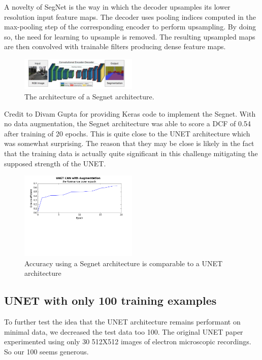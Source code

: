 \documentclass[letterpaper]{article}
\begin{document}
A novelty of SegNet  is the way in which the decoder upsamples its lower resolution input feature maps. The decoder uses pooling indices computed in the max-pooling step of the corresponding encoder to perform upsampling. By doing so, the need for learning to upsample is removed. The resulting upsampled maps are then convolved with trainable filters producing dense feature maps. 

 \begin{figure}[H]
  \centerline{\includegraphics[width=0.5\textwidth]{Images/SegNetArchitecture.png}}
  \caption{The architecture of a Segnet architecture.}
  \label{fig:segnet}
\end{figure}


Credit to Divam Gupta for providing Keras code to implement the Segnet. \cite{segnetimplementation}With no data augmentation, the Segnet architecture was able to score a DCF of 0.54 after training of 20 epochs. This is quite close to the UNET architecture which was somewhat surprising. The reason that they may be close is likely in the fact that the training data is actually quite significant in this challenge mitigating the supposed strength of the UNET.

 \begin{figure}[H]
  \centerline{\includegraphics[width=0.5\textwidth]{Plots/SegNet.png}}
  \caption{Accuracy using a Segnet architecture is comparable to a UNET architecture}
  \label{fig:trainingSegnet.}
\end{figure}

\subsection{UNET with only 100 training examples}
To further test the idea that the UNET architecture remains performant on minimal data, we decreased the test data too 100. The original UNET paper experimented using only 30 512X512 images of electron microscopic recordings. So our 100 seems generous. 
\end{document}
